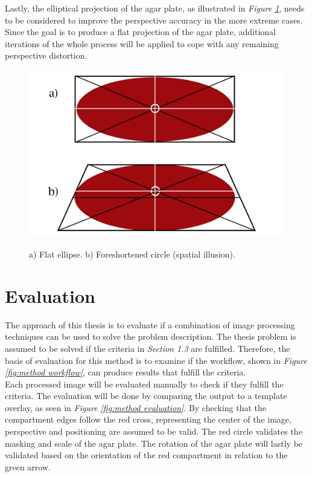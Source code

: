 \noindent Lastly, the elliptical projection of the agar plate, as illustrated in \textit{Figure \ref{fig:method projection}}, needs to be considered to improve the perspective accuracy in the more extreme cases. Since the goal is to produce a flat projection of the agar plate, additional iterations of the whole process will be applied to cope with any remaining perspective distortion.

\begin{figure}[htbp]
    \centering
    \includegraphics[width=0.5\linewidth]{figures/PDF/Ellipse_projection.pdf}\\
    \caption{a) Flat ellipse. b) Foreshortened circle (spatial illusion).}
    \label{fig:method projection}
\end{figure}



\section{Evaluation}
The approach of this thesis is to evaluate if a combination of image processing techniques can be used to solve the problem description. The thesis problem is assumed to be solved if the criteria in \textit{Section 1.3} are fulfilled. Therefore, the basis of evaluation for this method is to examine if the workflow, shown in \textit{Figure \ref{fig:method workflow}}, can produce results that fulfill the criteria. \\

\noindent Each processed image will be evaluated manually to check if they fulfill the criteria. The evaluation will be done by comparing the output to a template overlay, as seen in \textit{Figure \ref{fig:method evaluation}}. By checking that the compartment edges follow the red cross, representing the center of the image, perspective and positioning are assumed to be valid. The red circle validates the masking and scale of the agar plate. The rotation of the agar plate will lastly be validated based on the orientation of the red compartment in relation to the green arrow. 

